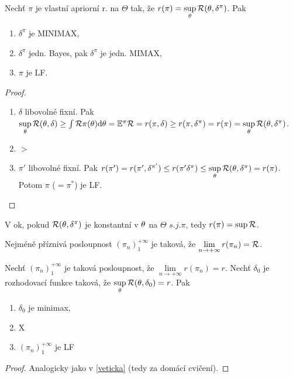 \begin{theorem}
	Nechť $\pi$ je vlastní apriorní r. na $\Theta$ tak, že $r(\pi)=\sup\limits_\theta\mathcal{R}(\theta,\delta^\pi)$. Pak \begin{enumerate}
		\item $\delta^\pi$ je MINIMAX,
		\item $\delta^\pi$ jedn. Bayes, pak $\delta^\pi$ je jedn. MIMAX,
		\item $\pi$ je LF. 
	\end{enumerate}
\begin{proof}
	\begin{enumerate}
		\item $\delta$ libovolné fixní. Pak $\sup\limits_\theta\mathcal{R}(\theta,\delta)\geq\int\mathcal{R}\pi(\theta)\mathrm{d}\theta=\mathbb{E}^\pi\mathcal{R}=r(\pi,\delta)\geq r(\pi,\delta^\pi)=r(\pi)=\sup\limits_\theta\mathcal{R}(\theta,\delta^\pi)$.
		\item $>$
		\item $\pi'$ libovolné fixní. Pak $r(\pi')=r(\pi',\delta^{\pi'})\leq r(\pi'\delta^\pi)\leq \sup\limits_\theta\mathcal{R}(\theta,\delta^\pi)=r(\pi)$. Potom $\pi$ ($=\pi^\ast$) je LF.
	\end{enumerate}
\end{proof}
\end{theorem}
\begin{dusl}
	V ok, pokud $\mathcal{R}(\theta,\delta^\pi)$ je konstantní v $\theta$ na $\Theta$ $s.j.\pi$, tedy $r(\pi)=\sup\mathcal{R}$.
\end{dusl}
\begin{theorem}
	Nejméně příznivá posloupnost $(\pi_n)_1^{+\infty}$ je taková, že $\lim\limits_{n\to+\infty} r(\pi_n)=\mathcal{R}$. 
\end{theorem}
\begin{theorem}
	Nechť $(\pi_n)_1^{+\infty}$ je taková posloupnost, že $\lim\limits_{n\to+\infty}r(\pi_n)=r$. Nechť $\delta_0$ je rozhodovací funkce taková, že $\sup\limits_\theta \mathcal{R}(\theta,\delta_0)=r$. Pak \begin{enumerate}
		\item $\delta_0$ je minimax,
		\item X
		\item $(\pi_n)_1^{+\infty}$ je LF
	\end{enumerate}
\begin{proof}
	Analogicky jako v \ref{veticka} (tedy za domácí cvičení).
\end{proof}
\end{theorem}
